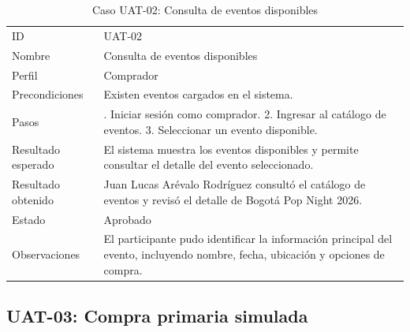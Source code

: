 \documentclass[12pt,letterpaper]{article}
\begin{document}
\begin{table}[H]
\centering
\begingroup
\footnotesize
\setlength{\tabcolsep}{3pt}
\renewcommand{\arraystretch}{1.25}

\begin{tabularx}{\textwidth}{|
>{\raggedright\arraybackslash}p{3.4cm}|
>{\raggedright\arraybackslash}X|}
\hline
\multicolumn{1}{|>{\centering\arraybackslash}m{3.4cm}|}{\textbf{Campo}} &
\multicolumn{1}{>{\centering\arraybackslash}m{10.8cm}|}{\textbf{Contenido}} \\
\hline
ID & UAT-02 \\
\hline
Nombre & Consulta de eventos disponibles \\
\hline
Perfil & Comprador \\
\hline
Precondiciones & Existen eventos cargados en el sistema. \\
\hline
Pasos & 1. Iniciar sesión como comprador. 2. Ingresar al catálogo de eventos. 3. Seleccionar un evento disponible. \\
\hline
Resultado esperado & El sistema muestra los eventos disponibles y permite consultar el detalle del evento seleccionado. \\
\hline
Resultado obtenido & Juan Lucas Arévalo Rodríguez consultó el catálogo de eventos y revisó el detalle de Bogotá Pop Night 2026. \\
\hline
Estado & Aprobado \\
\hline
Observaciones & El participante pudo identificar la información principal del evento, incluyendo nombre, fecha, ubicación y opciones de compra. \\
\hline
\end{tabularx}

\endgroup
\caption{Caso UAT-02: Consulta de eventos disponibles}
\label{tab:uat-02-eventos}
\end{table}

\subsection{UAT-03: Compra primaria simulada}
\end{document}
